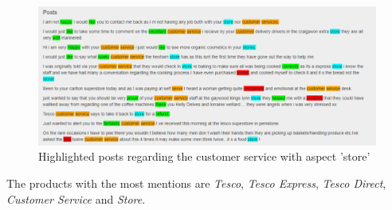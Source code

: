 \documentclass[10pt,a4paper]{article}
\begin{document}
		\begin{figure}[h]
			\centering
			\includegraphics[width=0.9\linewidth]{data/posts}
			\caption{Highlighted posts regarding the customer service with aspect 'store'}
			\label{fig:posts}
		\end{figure}
		
				
		The products with the most mentions are \textit{Tesco}, \textit{Tesco Express}, \textit{Tesco Direct}, \textit{Customer Service} and \textit{Store}.
		
\end{document}
